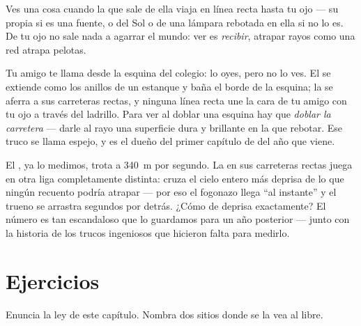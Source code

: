 \begin{proposition}\label{prop:g4:light-straight-lines:seeing}
Ves una cosa cuando la  que sale de ella viaja en línea recta
hasta tu ojo --- su propia  si es una fuente, o  del Sol o de
una lámpara rebotada en ella si no lo es. De tu ojo no sale nada a
agarrar el mundo: ver es \emph{recibir}, atrapar rayos como una red
atrapa pelotas.
\end{proposition}

\begin{example}\label{ex:g4:light-straight-lines:corner}
Tu amigo te llama desde la esquina del colegio: lo oyes, pero no lo
ves. El  se extiende como los anillos de un estanque y baña el
borde de la esquina; la  se aferra a sus carreteras rectas, y
ninguna línea recta une la cara de tu amigo con tu ojo a través del
ladrillo. Para ver al doblar una esquina hay que \emph{doblar la
carretera} --- darle al rayo una superficie dura y brillante en la que
rebotar. Ese truco se llama espejo, y es el dueño del primer capítulo
de  del año que viene.
\end{example}

\begin{remark}\label{rem:g4:light-straight-lines:speed}
El , ya lo medimos, trota a \qty{340}{m} por segundo. La
 en sus carreteras rectas juega en otra liga completamente
distinta: cruza el cielo entero más deprisa de lo que ningún recuento
podría atrapar --- por eso el fogonazo llega ``al instante'' y el
trueno se arrastra segundos por detrás. ¿Cómo de deprisa exactamente?
El número es tan escandaloso que lo guardamos para un año posterior
--- junto con la historia de los trucos ingeniosos que hicieron falta
para medirlo.
\end{remark}

\section{Ejercicios}

\begin{exercise}[$\star$]\label{exo:g4:light-straight-lines:1}
Enuncia la ley de este capítulo. Nombra dos sitios donde se la vea al
 libre.
\end{exercise}

